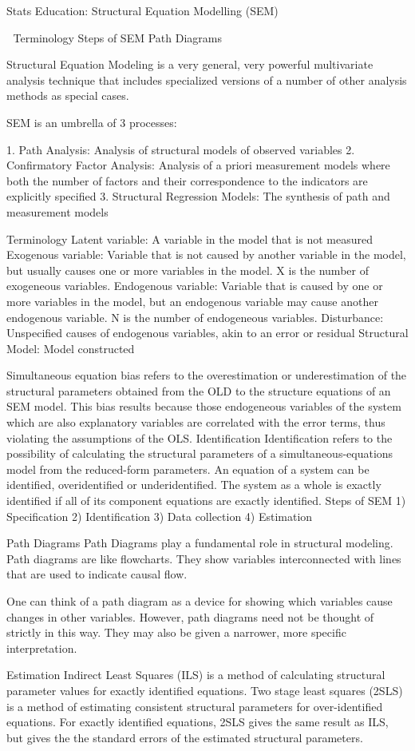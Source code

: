 Stats Education: Structural Equation Modelling (SEM)


Terminology
Steps of SEM
Path Diagrams

Structural Equation Modeling is a very general, very powerful multivariate analysis technique that includes specialized versions of a number of other analysis methods as special cases. 

SEM is an umbrella of 3 processes:

1. Path Analysis: Analysis of structural models of observed variables
2. Confirmatory Factor Analysis:  Analysis of a priori measurement models where both the number of factors and their
correspondence to the indicators are explicitly specified
3. Structural Regression Models: The synthesis of path and measurement models

Terminology
Latent variable: A variable in the model that is not measured
Exogenous variable: Variable that is not caused by another variable in the model, but usually causes one or more variables in the model.
X is the number of exogeneous variables.
Endogenous variable: Variable that is caused by one or more variables in the model, but an endogenous variable may cause another endogenous variable. N is the number of endogeneous variables.
Disturbance: Unspecified causes of endogenous variables, akin to an error or residual
Structural Model: Model constructed
 
Simultaneous equation bias refers to the overestimation or underestimation of the structural parameters obtained from the OLD to the structure equations of an SEM model. This bias results because those endogeneous variables of the system which are also explanatory variables are correlated with the error terms, thus violating the assumptions of the OLS.
Identification
Identification refers to the possibility of calculating the structural parameters of a simultaneous-equations model from the reduced-form parameters.
An equation of a system can be identified, overidentified or underidentified. The system as a whole is exactly identified if all of its component equations are exactly identified.
Steps of SEM
1) Specification
2) Identification
3) Data collection
4) Estimation

Path Diagrams
Path Diagrams play a fundamental role in structural modeling. Path diagrams are like flowcharts. They show variables interconnected with lines that are used to indicate causal flow.

One can think of a path diagram as a device for showing which variables cause changes in other variables. However, path diagrams need not be thought of strictly in this way. They may also be given a narrower, more specific interpretation.

Estimation
Indirect Least Squares (ILS) is a method of calculating structural parameter values for exactly identified equations.
Two stage least squares (2SLS) is a method of estimating consistent structural parameters for over-identified equations. For exactly identified equations, 2SLS gives the same result as ILS, but gives the the standard errors of the estimated structural parameters.

